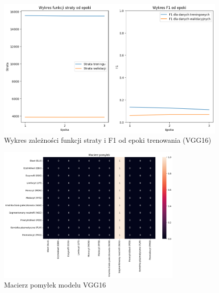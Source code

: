 \begin{figure}
    \centering
    \includegraphics[width=\textwidth]{experiments/vgg16/combined}
    \caption{Wykres zależności funkcji straty i F1 od epoki trenowania (VGG16)}
    \label{fig:plot_vgg16}
\end{figure}
\begin{figure}
    \centering
    \includegraphics[width=0.8\textwidth]{experiments/vgg16/confusion_matrix}
    \caption{Macierz pomyłek modelu VGG16}
    \label{fig:confusion_vgg16}
\end{figure}

